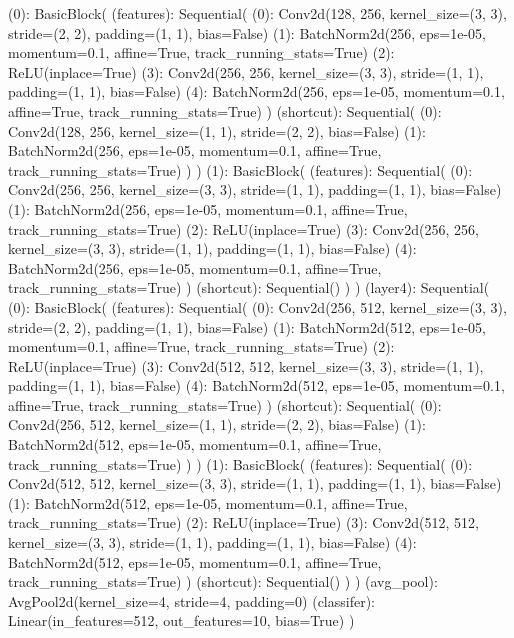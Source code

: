 \documentclass[UTF8,a4paper,10pt]{ctexart}
\begin{document}
\begin{python}
    (0): BasicBlock(
      (features): Sequential(
        (0): Conv2d(128, 256, kernel_size=(3, 3), stride=(2, 2), padding=(1, 1), bias=False)
        (1): BatchNorm2d(256, eps=1e-05, momentum=0.1, affine=True, track_running_stats=True)
        (2): ReLU(inplace=True)
        (3): Conv2d(256, 256, kernel_size=(3, 3), stride=(1, 1), padding=(1, 1), bias=False)
        (4): BatchNorm2d(256, eps=1e-05, momentum=0.1, affine=True, track_running_stats=True)
      )
      (shortcut): Sequential(
        (0): Conv2d(128, 256, kernel_size=(1, 1), stride=(2, 2), bias=False)
        (1): BatchNorm2d(256, eps=1e-05, momentum=0.1, affine=True, track_running_stats=True)
      )
    )
    (1): BasicBlock(
      (features): Sequential(
        (0): Conv2d(256, 256, kernel_size=(3, 3), stride=(1, 1), padding=(1, 1), bias=False)
        (1): BatchNorm2d(256, eps=1e-05, momentum=0.1, affine=True, track_running_stats=True)
        (2): ReLU(inplace=True)
        (3): Conv2d(256, 256, kernel_size=(3, 3), stride=(1, 1), padding=(1, 1), bias=False)
        (4): BatchNorm2d(256, eps=1e-05, momentum=0.1, affine=True, track_running_stats=True)
      )
      (shortcut): Sequential()
    )
  )
  (layer4): Sequential(
    (0): BasicBlock(
      (features): Sequential(
        (0): Conv2d(256, 512, kernel_size=(3, 3), stride=(2, 2), padding=(1, 1), bias=False)
        (1): BatchNorm2d(512, eps=1e-05, momentum=0.1, affine=True, track_running_stats=True)
        (2): ReLU(inplace=True)
        (3): Conv2d(512, 512, kernel_size=(3, 3), stride=(1, 1), padding=(1, 1), bias=False)
        (4): BatchNorm2d(512, eps=1e-05, momentum=0.1, affine=True, track_running_stats=True)
      )
      (shortcut): Sequential(
        (0): Conv2d(256, 512, kernel_size=(1, 1), stride=(2, 2), bias=False)
        (1): BatchNorm2d(512, eps=1e-05, momentum=0.1, affine=True, track_running_stats=True)
      )
    )
    (1): BasicBlock(
      (features): Sequential(
        (0): Conv2d(512, 512, kernel_size=(3, 3), stride=(1, 1), padding=(1, 1), bias=False)
        (1): BatchNorm2d(512, eps=1e-05, momentum=0.1, affine=True, track_running_stats=True)
        (2): ReLU(inplace=True)
        (3): Conv2d(512, 512, kernel_size=(3, 3), stride=(1, 1), padding=(1, 1), bias=False)
        (4): BatchNorm2d(512, eps=1e-05, momentum=0.1, affine=True, track_running_stats=True)
      )
      (shortcut): Sequential()
    )
  )
  (avg_pool): AvgPool2d(kernel_size=4, stride=4, padding=0)
  (classifer): Linear(in_features=512, out_features=10, bias=True)
)
\end{python}
\end{document}
